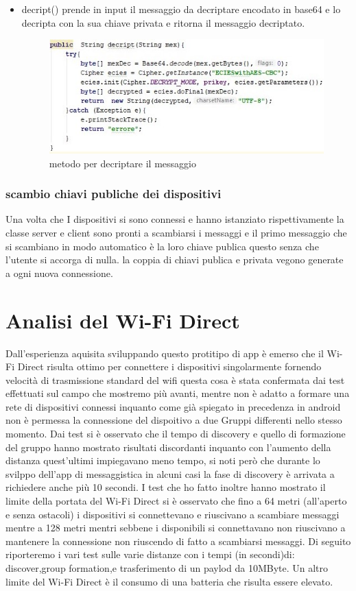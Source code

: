 \begin{itemize}
    \item decript() prende in input il messaggio da decriptare encodato in base64 
    e lo decripta con
    la sua chiave privata e ritorna il messaggio decriptato.
    \begin{figure}
        \caption{metodo per decriptare il messaggio}
        \includegraphics[width=0.6  \columnwidth]{imgs/decript.jpg}
    \end{figure}



\end{itemize} 

\subsubsection{scambio chiavi publiche dei dispositivi} 
Una volta che I dispositivi si sono connessi e hanno istanziato
rispettivamente la classe server e client sono pronti a scambiarsi i messaggi
e il primo messaggio che si scambiano in modo automatico è la loro chiave publica
questo senza che l'utente si accorga di nulla.
la coppia di chiavi publica e privata vegono generate a ogni nuova connessione.


\section{Analisi del Wi-Fi Direct}

Dall'esperienza aquisita sviluppando questo protitipo di app è emerso 
che il Wi-Fi Direct risulta ottimo per connettere i dispositivi singolarmente
fornendo velocità di trasmissione standard del wifi questa cosa è stata confermata
dai test effettuati sul campo che mostremo più avanti, 
mentre non è adatto a formare una rete di dispositivi connessi inquanto
come già spiegato in precedenza in android non è permessa la connessione
del dispoitivo a due Gruppi differenti nello stesso momento.
Dai test si è osservato che il tempo di discovery e quello di formazione del gruppo
hanno mostrato risultati discordanti inquanto con l'aumento della distanza quest'ultimi
impiegavano meno tempo, si noti però che durante lo svilppo dell'app di messaggistica
in alcuni casi la fase di discovery è arrivata a richiedere anche più 10 secondi.
I test che ho fatto inoltre hanno mostrato il limite della portata
del Wi-Fi Direct si è osservato che fino a 64 metri
(all'aperto e senza ostacoli) i dispositivi
si connettevano e riuscivano a scambiare messaggi  mentre a 128 metri
mentri sebbene i disponibili si connettavano non riuscivano
a mantenere la connessione non riuscendo di fatto a scambiarsi messaggi.
Di seguito riporteremo i vari test sulle varie distanze con i tempi (in secondi)di:
discover,group formation,e trasferimento di un paylod da 10MByte.
Un altro limite del Wi-Fi Direct è il consumo di una batteria che risulta
essere elevato.

